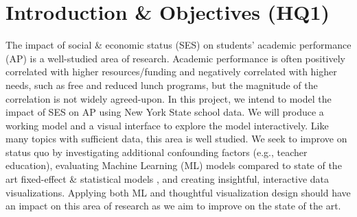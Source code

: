 \documentclass[sigconf,nonacm,11pt]{acmart}
\begin{document}



\maketitle



\section{Introduction \& Objectives (HQ1)}

The impact of  social \& economic status (SES) on students' academic performance (AP) is a well-studied area of research.  Academic performance is often positively correlated with higher resources/funding \cite{jinnai}and negatively correlated with higher needs, such as free and reduced lunch programs\cite{sirin}, but the magnitude of the correlation is not widely agreed-upon. In this project, we intend to model the impact of SES on AP using New York State school data. We will produce a working model and a visual interface to explore the model interactively. Like many topics with sufficient data, this area is well studied. We seek to improve on status quo by investigating additional confounding factors (e.g., teacher education), evaluating Machine Learning (ML) models compared to state of the art fixed-effect \& statistical models \cite{hearn, farooq}, and creating insightful, interactive data visualizations. Applying both ML and thoughtful visualization design should have an impact on this area of research as we aim to improve on the state of the art.
\end{document}

